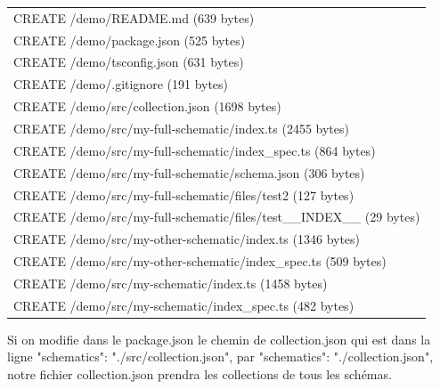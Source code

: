 \documentclass[12pt,french]{article}
\begin{document}
	\begin{tabular}{l}
		CREATE /demo/README.md (639 bytes)\\
		CREATE /demo/package.json (525 bytes)
\\
		CREATE /demo/tsconfig.json (631 bytes)
\\
		CREATE /demo/.gitignore (191 bytes)
\\
		CREATE /demo/src/collection.json (1698 bytes)\\
		CREATE /demo/src/my-full-schematic/index.ts (2455 bytes)
\\
		CREATE /demo/src/my-full-schematic/index\_spec.ts (864 bytes)\\
		CREATE /demo/src/my-full-schematic/schema.json (306 bytes)
\\
		CREATE /demo/src/my-full-schematic/files/test2 (127 bytes)
\\
		CREATE /demo/src/my-full-schematic/files/test\_\_INDEX\_\_ (29 bytes)\\
		CREATE /demo/src/my-other-schematic/index.ts (1346 bytes)
\\
		CREATE /demo/src/my-other-schematic/index\_spec.ts (509 bytes)\\
		CREATE /demo/src/my-schematic/index.ts (1458 bytes)
\\
		CREATE /demo/src/my-schematic/index\_spec.ts (482 bytes)\\
	\end{tabular}\newline

	Si on modifie dans le package.json le chemin de collection.json qui est dans la ligne "schematics": "./src/collection.json", par "schematics": "./collection.json", notre fichier collection.json prendra les collections de tous les schémas.\newline
	
\end{document}
